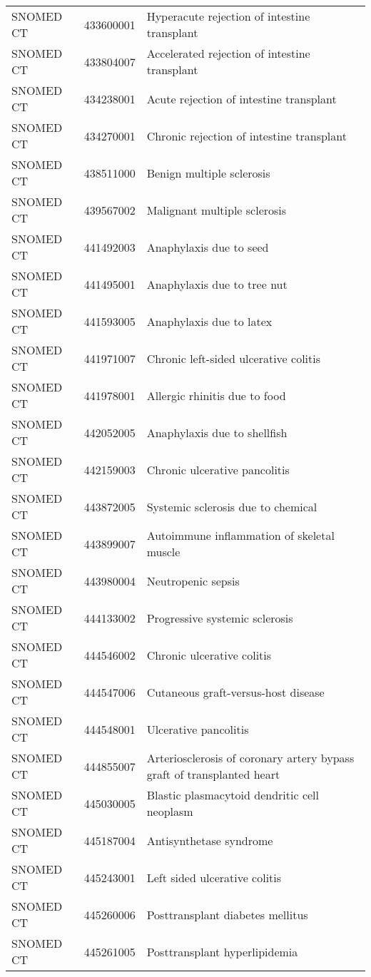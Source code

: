 \begin{longtable}{p{}p{}p{}}
  SNOMED CT & 433600001 & Hyperacute rejection of intestine transplant \\ 
  SNOMED CT & 433804007 & Accelerated rejection of intestine transplant \\ 
  SNOMED CT & 434238001 & Acute rejection of intestine transplant \\ 
  SNOMED CT & 434270001 & Chronic rejection of intestine transplant \\ 
  SNOMED CT & 438511000 & Benign multiple sclerosis \\ 
  SNOMED CT & 439567002 & Malignant multiple sclerosis \\ 
  SNOMED CT & 441492003 & Anaphylaxis due to seed \\ 
  SNOMED CT & 441495001 & Anaphylaxis due to tree nut \\ 
  SNOMED CT & 441593005 & Anaphylaxis due to latex \\ 
  SNOMED CT & 441971007 & Chronic left-sided ulcerative colitis \\ 
  SNOMED CT & 441978001 & Allergic rhinitis due to food \\ 
  SNOMED CT & 442052005 & Anaphylaxis due to shellfish \\ 
  SNOMED CT & 442159003 & Chronic ulcerative pancolitis \\ 
  SNOMED CT & 443872005 & Systemic sclerosis due to chemical \\ 
  SNOMED CT & 443899007 & Autoimmune inflammation of skeletal muscle \\ 
  SNOMED CT & 443980004 & Neutropenic sepsis \\ 
  SNOMED CT & 444133002 & Progressive systemic sclerosis \\ 
  SNOMED CT & 444546002 & Chronic ulcerative colitis \\ 
  SNOMED CT & 444547006 & Cutaneous graft-versus-host disease \\ 
  SNOMED CT & 444548001 & Ulcerative pancolitis \\ 
  SNOMED CT & 444855007 & Arteriosclerosis of coronary artery bypass graft of transplanted heart \\ 
  SNOMED CT & 445030005 & Blastic plasmacytoid dendritic cell neoplasm \\ 
  SNOMED CT & 445187004 & Antisynthetase syndrome \\ 
  SNOMED CT & 445243001 & Left sided ulcerative colitis \\ 
  SNOMED CT & 445260006 & Posttransplant diabetes mellitus \\ 
  SNOMED CT & 445261005 & Posttransplant hyperlipidemia \\ 

\end{longtable}
